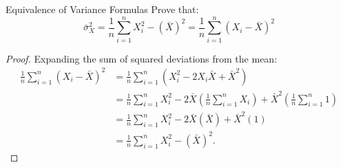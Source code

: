 \documentclass[11pt, a4paper]{article}
\begin{document}
\begin{problem}{Equivalence of Variance Formulas}{}
Prove that:
\[ \bar{\sigma}_X^2 = \frac{1}{n}\sum_{i=1}^n X_i^2 - (\bar{X})^2 = \frac{1}{n}\sum_{i=1}^n (X_i - \bar{X})^2 \]
\end{problem}

\begin{proof}[Proof]
Expanding the sum of squared deviations from the mean:
\begin{align*}
    \frac{1}{n}\sum_{i=1}^n (X_i - \bar{X})^2 &= \frac{1}{n}\sum_{i=1}^n (X_i^2 - 2X_i\bar{X} + \bar{X}^2) \\
    &= \frac{1}{n}\sum_{i=1}^n X_i^2 - 2\bar{X}\left(\frac{1}{n}\sum_{i=1}^n X_i\right) + \bar{X}^2\left(\frac{1}{n}\sum_{i=1}^n 1\right) \\
    &= \frac{1}{n}\sum_{i=1}^n X_i^2 - 2\bar{X}(\bar{X}) + \bar{X}^2(1) \\
    &= \frac{1}{n}\sum_{i=1}^n X_i^2 - (\bar{X})^2.
\end{align*}%
\end{proof}
\end{document}

